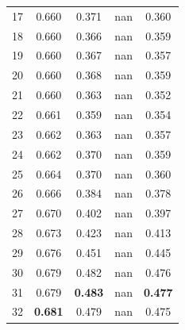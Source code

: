 \documentclass[11pt,a4paper]{article}
\begin{document}
\begin{table}[H]
\begin{tabular}{rcccc}
17 & 0.660 & 0.371 & nan & 0.360 \\

18 & 0.660 & 0.366 & nan & 0.359 \\

19 & 0.660 & 0.367 & nan & 0.357 \\

20 & 0.660 & 0.368 & nan & 0.359 \\

21 & 0.660 & 0.363 & nan & 0.352 \\

22 & 0.661 & 0.359 & nan & 0.354 \\

23 & 0.662 & 0.363 & nan & 0.357 \\

24 & 0.662 & 0.370 & nan & 0.359 \\

25 & 0.664 & 0.370 & nan & 0.360 \\

26 & 0.666 & 0.384 & nan & 0.378 \\

27 & 0.670 & 0.402 & nan & 0.397 \\

28 & 0.673 & 0.423 & nan & 0.413 \\

29 & 0.676 & 0.451 & nan & 0.445 \\

30 & 0.679 & 0.482 & nan & 0.476 \\

31 & 0.679 & \textbf{0.483} & nan & \textbf{0.477} \\

32 & \textbf{0.681} & 0.479 & nan & 0.475 \\

\bottomrule

\end{tabular}

\end{table}
\end{document}
